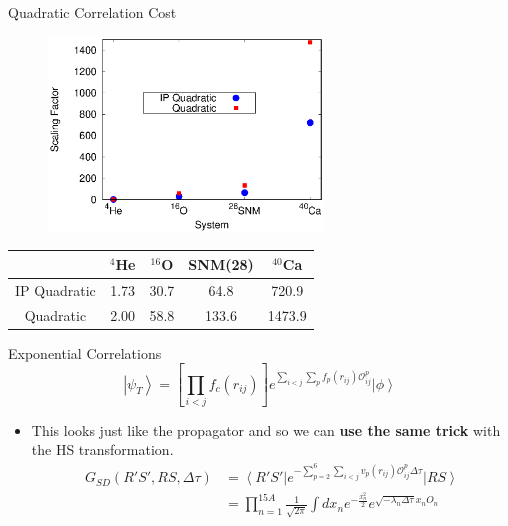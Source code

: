 \documentclass{beamer}
\newcommand{\ket}[1]{\left| #1 \right>}
\newcommand{\bra}[1]{\left< #1 \right|}
\newcommand{\fpij}{f_p(r_{ij})}
\newcommand{\Opij}{\mathcal{O}_{ij}^p}
\newcommand{\dt}{\Delta\tau}
\begin{document}
\begin{frame}{Quadratic Correlation Cost}
\begin{figure}[h]
   \centering
   \includegraphics[width=0.65\textwidth]{../figures/scaling.eps}
\end{figure}
\vspace{-0.2cm}
\begin{table}[h!]
   \centering
   \begin{tabular}{ccccc}
      \hline \hline
       & $^{4}$He & $^{16}$O & SNM(28) & $^{40}$Ca \\
      \hline
      IP Quadratic & 1.73 & 30.7 & 64.8 & 720.9 \\
      Quadratic & 2.00 & 58.8 & 133.6 & 1473.9 \\
      \hline \hline
   \end{tabular}
\end{table}
\end{frame}

\begin{frame}{Exponential Correlations}
\begin{equation*}
   \ket{\psi_T} = \left[\prod\limits_{i<j}f_c(r_{ij})\right] e^{\sum\limits_{i<j}\sum\limits_p\fpij\Opij} \ket{\phi}
\end{equation*}
\begin{itemize}
   \item This looks just like the propagator and so we can {\bf use the same trick} with the HS transformation.
\begin{align*}
   G_{SD}(R'S',RS,\dt) &= \bra {R'S'}e^{-\sum\limits_{p=2}^6\sum\limits_{i<j}v_p(r_{ij})\Opij\dt} \ket{RS} \\
      &= \prod\limits_{n=1}^{15A}\frac{1}{\sqrt{2\pi}}\int dx_n e^{-\frac{x_n^2}{2}}e^{\sqrt{-\lambda_n\dt} x_nO_n}
\end{align*}
\end{itemize}
\end{frame}
\end{document}
